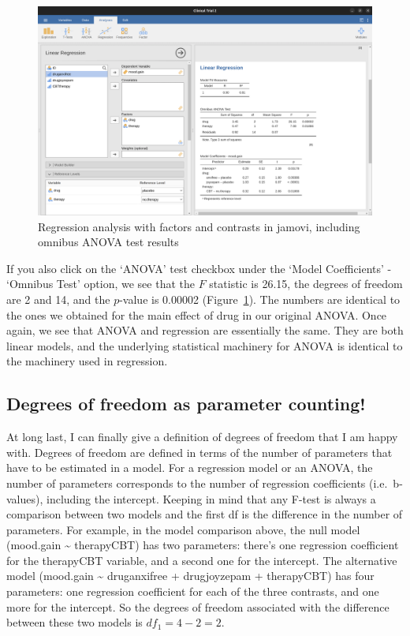\documentclass[
  a4paper,
]{book}
\begin{document}
\begin{figure}

\includegraphics[width=1\textwidth,height=\textheight]{images/fig14-23.png} \hfill{}

\caption{\label{fig-fig14-23}Regression analysis with factors and
contrasts in jamovi, including omnibus ANOVA test results}

\end{figure}

If you also click on the `ANOVA' test checkbox under the `Model
Coefficients' - `Omnibus Test' option, we see that the \(F\) statistic
is 26.15, the degrees of freedom are 2 and 14, and the \(p\)-value is
0.00002 (Figure~\ref{fig-fig14-23}). The numbers are identical to the
ones we obtained for the main effect of drug in our original ANOVA. Once
again, we see that ANOVA and regression are essentially the same. They
are both linear models, and the underlying statistical machinery for
ANOVA is identical to the machinery used in regression.

\hypertarget{degrees-of-freedom-as-parameter-counting}{%
\subsection{Degrees of freedom as parameter
counting!}\label{degrees-of-freedom-as-parameter-counting}}

At long last, I can finally give a definition of degrees of freedom that
I am happy with. Degrees of freedom are defined in terms of the number
of parameters that have to be estimated in a model. For a regression
model or an ANOVA, the number of parameters corresponds to the number of
regression coefficients (i.e.~b-values), including the intercept.
Keeping in mind that any F-test is always a comparison between two
models and the first df is the difference in the number of parameters.
For example, in the model comparison above, the null model (mood.gain
\textasciitilde{} therapyCBT) has two parameters: there's one regression
coefficient for the therapyCBT variable, and a second one for the
intercept. The alternative model (mood.gain \textasciitilde{}
druganxifree + drugjoyzepam + therapyCBT) has four parameters: one
regression coefficient for each of the three contrasts, and one more for
the intercept. So the degrees of freedom associated with the difference
between these two models is \(df_1 = 4 - 2 = 2\).
\end{document}
